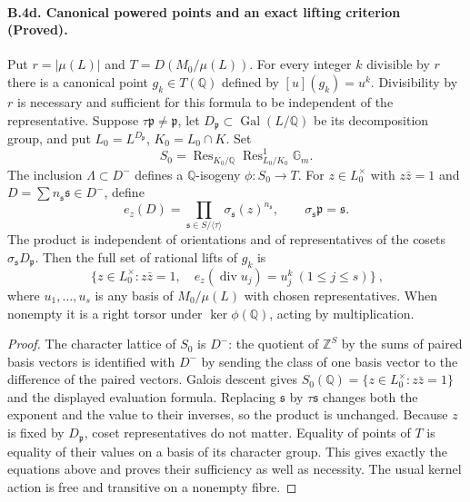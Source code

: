 \paragraph{B.4d. Canonical powered points and an exact lifting criterion
(Proved).}
\label{B4d}
Put $r=|\mu(L)|$ and $T=D(M_0/\mu(L))$. For every integer $k$ divisible
by $r$ there is a canonical point $g_k\in T(\mathbb Q)$ defined by
$[u](g_k)=u^k$. Divisibility by $r$ is necessary and sufficient for
this formula to be independent of the representative. Suppose
$\tau\mathfrak p\ne\mathfrak p$, let
$D_{\mathfrak p}\subset\operatorname{Gal}(L/\mathbb Q)$ be its
decomposition group, and put $L_0=L^{D_{\mathfrak p}}$,
$K_0=L_0\cap K$. Set
\[
 S_0=\operatorname{Res}_{K_0/\mathbb Q}
       \operatorname{Res}^{1}_{L_0/K_0}\mathbb G_m.
\]
The inclusion $\Lambda\subset D^-$ defines a $\mathbb Q$-isogeny
$\phi:S_0\to T$. For $z\in L_0^\times$ with $z\bar z=1$ and
$D=\sum n_{\mathfrak s}\mathfrak s\in D^-$, define
\[
 e_z(D)=\prod_{\mathfrak s\in S/\langle\tau\rangle}
              \sigma_{\mathfrak s}(z)^{n_{\mathfrak s}},
 \qquad\sigma_{\mathfrak s}\mathfrak p=\mathfrak s.
\]
The product is independent of orientations and of representatives of
the cosets $\sigma_{\mathfrak s}D_{\mathfrak p}$. Then the full set of
rational lifts of $g_k$ is
\[
 \boxed{\ \{z\in L_0^\times: z\bar z=1,\quad
 e_z(\operatorname{div}u_j)=u_j^k\ (1\leq j\leq s)\}\ },
\]
where $u_1,\ldots,u_s$ is any basis of $M_0/\mu(L)$ with chosen
representatives. When nonempty it is a right torsor under
$\ker\phi(\mathbb Q)$, acting by multiplication.

\begin{proof}
The character lattice of $S_0$ is $D^-$: the quotient of
$\mathbb Z^S$ by the sums of paired basis vectors is identified with
$D^-$ by sending the class of one basis vector to the difference of
the paired vectors. Galois descent gives
$S_0(\mathbb Q)=\{z\in L_0^\times:z\bar z=1\}$ and the displayed
evaluation formula. Replacing $\mathfrak s$ by $\tau\mathfrak s$
changes both the exponent and the value to their inverses, so the
product is unchanged. Because $z$ is fixed by $D_{\mathfrak p}$,
coset representatives do not matter. Equality of points of $T$ is
equality of their values on a basis of its character group. This
gives exactly the equations above and proves their sufficiency as
well as necessity. The usual kernel action is free and transitive
on a nonempty fibre.
\end{proof}

